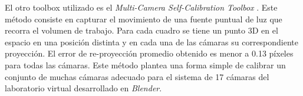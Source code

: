 El otro toolbox utilizado es el \textit{Multi-Camera Self-Calibration Toolbox} \cite{toolbox_led}. Este método consiste en capturar el movimiento de una fuente puntual de luz que recorra el volumen de trabajo. Para cada cuadro se tiene un punto 3D en el espacio en una posición distinta y en cada una de las cámaras su correspondiente proyección.
 El error de re-proyección promedio obtenido es menor a 0.13 píxeles para todas las cámaras. Este método plantea una forma simple de calibrar un conjunto de muchas cámaras adecuado para el sistema de 17 cámaras del laboratorio virtual desarrollado en \emph{Blender}.

 
 











